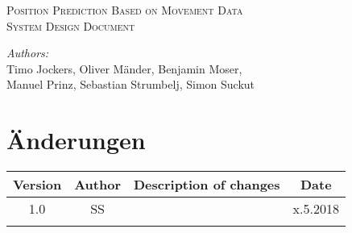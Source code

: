 \documentclass[12pt]{article} %
\begin{document}


\begin{titlepage}

\newcommand{\HRule}{\rule{\linewidth}{0.5mm}} %

\center %

\textsc{\Large Position Prediction Based on Movement Data}\\[0.5cm] %
\textsc{\large System Design Document}\\[0.5cm] %

\vfill

\emph{Authors:}\\
Timo Jockers, Oliver Mänder, Benjamin Moser, \\
Manuel Prinz, Sebastian Strumbelj, Simon Suckut

\vfill %

\end{titlepage}


\tableofcontents %

\newpage %


\section{Änderungen}


\begin{tabular}{|c|c|p{10cm}|c|}
\hline
Version & Author & Description of changes & Date \\ \hline\hline

1.0 & SS & \color{red}{Aufbau der App in Android Studio} & x.5.2018 \\\hline
	&	&	&	\\\hline

\end{tabular}
\end{document}
